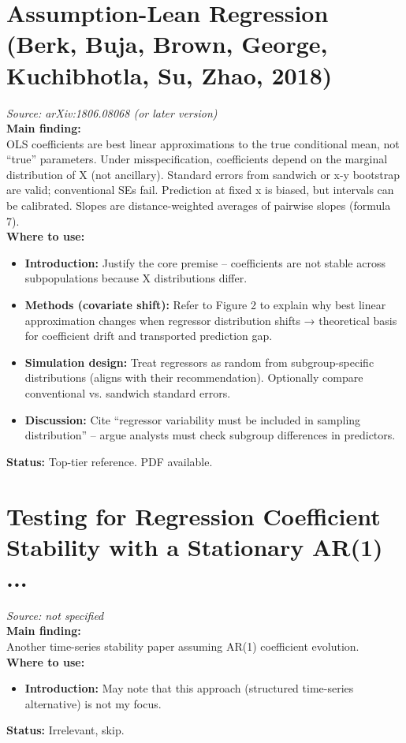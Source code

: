 \documentclass[11pt]{article}
\begin{document}
\section{Assumption-Lean Regression (Berk, Buja, Brown, George, Kuchibhotla, Su, Zhao, 2018)}
\textit{Source: arXiv:1806.08068 (or later version)} \\
\textbf{Main finding:} \\
OLS coefficients are best linear approximations to the true conditional mean, not ``true'' parameters. Under misspecification, coefficients depend on the marginal distribution of X (not ancillary). Standard errors from sandwich or x-y bootstrap are valid; conventional SEs fail. Prediction at fixed x is biased, but intervals can be calibrated. Slopes are distance-weighted averages of pairwise slopes (formula 7). \\
\textbf{Where to use:}
\begin{itemize}
    \item \textbf{Introduction:} Justify the core premise – coefficients are not stable across subpopulations because X distributions differ.
    \item \textbf{Methods (covariate shift):} Refer to Figure 2 to explain why best linear approximation changes when regressor distribution shifts → theoretical basis for coefficient drift and transported prediction gap.
    \item \textbf{Simulation design:} Treat regressors as random from subgroup-specific distributions (aligns with their recommendation). Optionally compare conventional vs. sandwich standard errors.
    \item \textbf{Discussion:} Cite ``regressor variability must be included in sampling distribution'' – argue analysts must check subgroup differences in predictors.
\end{itemize}
\textbf{Status:} Top-tier reference. PDF available.

\section{Testing for Regression Coefficient Stability with a Stationary AR(1) ...}
\textit{Source: not specified} \\
\textbf{Main finding:} \\
Another time-series stability paper assuming AR(1) coefficient evolution. \\
\textbf{Where to use:}
\begin{itemize}
    \item \textbf{Introduction:} May note that this approach (structured time-series alternative) is not my focus.
\end{itemize}
\textbf{Status:} Irrelevant, skip.
\end{document}
